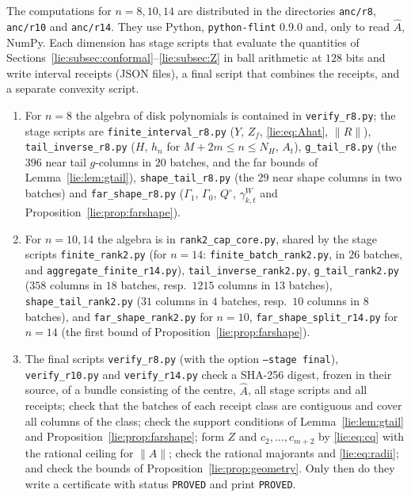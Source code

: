 \documentclass[11pt]{amsart}
\theoremstyle{definition}
\theoremstyle{remark}
\numberwithin{equation}{section}
\newcommand{\nrm}[1]{\lVert #1\rVert}
\begin{document}
The computations for $n=8,10,14$ are distributed in the directories \texttt{anc/r8}, \texttt{anc/r10} and \texttt{anc/r14}. They use Python, \texttt{python-flint} 0.9.0 \cite{flint,Joh17} and, only to read $\widehat A$, NumPy. Each dimension has stage scripts that evaluate the quantities of Sections~\ref{lie:subsec:conformal}--\ref{lie:subsec:Z} in ball arithmetic at $128$ bits and write interval receipts (JSON files), a final script that combines the receipts, and a separate convexity script.
{\sloppy
\begin{enumerate}[label=(\arabic*)]
\item For $n=8$ the algebra of disk polynomials is contained in \texttt{verify\_r8.py}; the stage scripts are \texttt{finite\_interval\_r8.py} ($Y$, $Z_f$, \eqref{lie:eq:Ahat}, $\nrm R$), \texttt{tail\_inverse\_r8.py} ($H$, $h_n$ for $M+2m\leq n\leq N_H$, $A_t$), \texttt{g\_tail\_r8.py} (the $396$ near tail $g$-columns in $20$ batches, and the far bounds of Lemma~\ref{lie:lem:gtail}), \texttt{shape\_tail\_r8.py} (the $29$ near shape columns in two batches) and \texttt{far\_shape\_r8.py} ($\Gamma_1$, $\Gamma_0$, $Q^\circ$, $\gamma^W_{k,t}$ and Proposition~\ref{lie:prop:farshape}).
\item For $n=10,14$ the algebra is in \texttt{rank2\_cap\_core.py}, shared by the stage scripts \texttt{finite\_rank2.py} (for $n=14$: \texttt{finite\_batch\_rank2.py}, in $26$ batches, and \texttt{aggregate\_finite\_r14.py}), \texttt{tail\_inverse\_rank2.py}, \texttt{g\_tail\_rank2.py} ($358$ columns in $18$ batches, resp.\ $1215$ columns in $13$ batches), \texttt{shape\_tail\_rank2.py} ($31$ columns in $4$ batches, resp.\ $10$ columns in $8$ batches), and \texttt{far\_shape\_rank2.py} for $n=10$, \texttt{far\_shape\_split\_r14.py} for $n=14$ (the first bound of Proposition~\ref{lie:prop:farshape}).
\item The final scripts \texttt{verify\_r8.py} (with the option \texttt{--stage final}), \texttt{verify\_r10.py} and \texttt{verify\_r14.py} check a SHA-256 digest, frozen in their source, of a bundle consisting of the centre, $\widehat A$, all stage scripts and all receipts; check that the batches of each receipt class are contiguous and cover all columns of the class; check the support conditions of Lemma~\ref{lie:lem:gtail} and Proposition~\ref{lie:prop:farshape}; form $Z$ and $c_2,\ldots,c_{m+2}$ by \eqref{lie:eq:cq} with the rational ceiling for $\nrm A$; check the rational majorants and \eqref{lie:eq:radii}; and check the bounds of Proposition~\ref{lie:prop:geometry}. Only then do they write a certificate with status \texttt{PROVED} and print \texttt{PROVED}.

\end{enumerate}}
\end{document}
